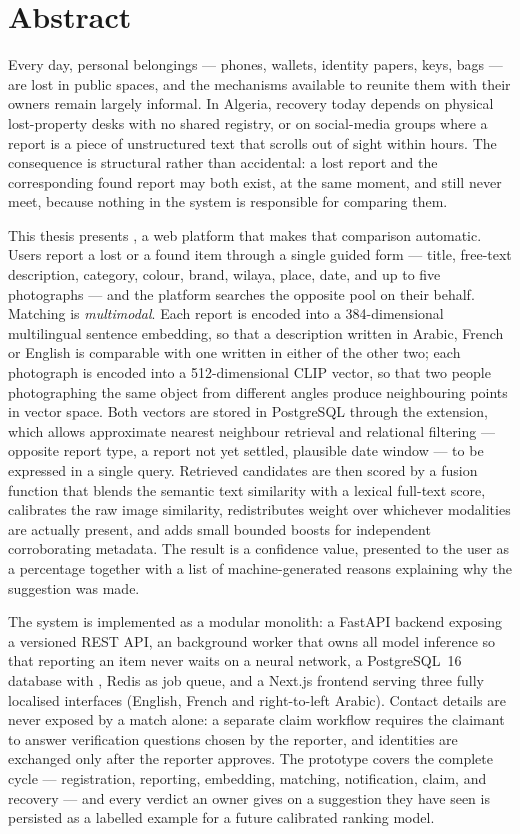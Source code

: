 \chapter*{Abstract}

Every day, personal belongings --- phones, wallets, identity papers, keys, bags
--- are lost in public spaces, and the mechanisms available to reunite them
with their owners remain largely informal. In Algeria, recovery today depends
on physical lost-property desks with no shared registry, or on social-media
groups where a report is a piece of unstructured text that scrolls out of sight
within hours. The consequence is structural rather than accidental: a lost
report and the corresponding found report may both exist, at the same moment,
and still never meet, because nothing in the system is responsible for
comparing them.

This thesis presents \projectname, a web platform that makes that comparison
automatic. Users report a lost or a found item through a single guided form ---
title, free-text description, category, colour, brand, wilaya, place, date, and
up to five photographs --- and the platform searches the opposite pool on their
behalf. Matching is \emph{multimodal}. Each report is encoded into a
384-dimensional multilingual sentence embedding, so that a description written
in Arabic, French or English is comparable with one written in either of the
other two; each photograph is encoded into a 512-dimensional CLIP vector, so
that two people photographing the same object from different angles produce
neighbouring points in vector space. Both vectors are stored in PostgreSQL
through the  extension, which allows approximate nearest
neighbour retrieval and relational filtering --- opposite report type, a report
not yet settled, plausible date window --- to be expressed in a single query. Retrieved
candidates are then scored by a fusion function that blends the semantic text
similarity with a lexical full-text score, calibrates the raw image similarity,
redistributes weight over whichever modalities are actually present, and adds
small bounded boosts for independent corroborating metadata. The result is a
confidence value, presented to the user as a percentage together with a list of
machine-generated reasons explaining why the suggestion was made.

The system is implemented as a modular monolith: a FastAPI backend exposing a
versioned REST API, an  background worker that owns all model
inference so that reporting an item never waits on a neural network, a
PostgreSQL~16 database with , Redis as job queue, and a
Next.js frontend serving three fully localised interfaces (English, French and
right-to-left Arabic). Contact details are never exposed by a match alone: a
separate claim workflow requires the claimant to answer verification questions
chosen by the reporter, and identities are exchanged only after the reporter
approves. The prototype covers the complete cycle --- registration,
reporting, embedding, matching, notification, claim, and recovery --- and every
verdict an owner gives on a suggestion they have seen is persisted as a labelled
example for a future calibrated ranking model.


